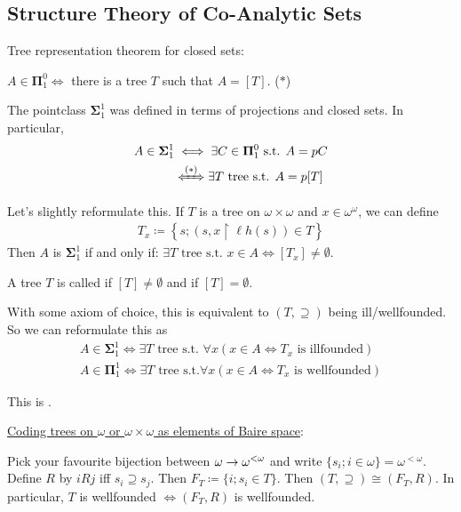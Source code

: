 \documentclass[]{article}
\newcommand{\om}{\omega}
\newcommand{\lom}{{<\omega}}
\newcommand{\lh}{\ell h}
\newcommand{\bosig}{\bm{\Sigma}}
\newcommand{\bopi}{\bm{\Pi}}
\begin{document}
\subsection*{Structure Theory of Co-Analytic Sets}

Tree representation theorem for closed sets:

$ A \in \bopi^0_1 \iff $ there is a tree $T$ such that $A = [T]$. ($\ast$)

The pointclass $\bosig^1_1$ was defined in terms of projections and closed sets. In particular,
\begin{align*}
A \in \bosig^1_1&\iff \exists C\in \bopi^0_1 \textrm{ s.t. } A = pC\\
&\xLeftrightarrow{(\ast)} \exists T\textrm{ tree s.t. }A = p[T]
\end{align*}

Let's slightly reformulate this. If $T$ is a tree on $\om \times \om$ and $x \in \om^\om$, we can define
\begin{align*}
    T_x\coloneqq \left\lbrace s; (s,x\restriction \lh(s))\in T\right\rbrace
\end{align*}
Then $A$ is $\bosig^1_1$ if and only if: $\exists T \textrm{ tree s.t. } x \in A \iff [T_x]\ne \emptyset$.

\begin{defin*}
    A tree $T$ is called  if $[T] \ne \emptyset$ and  if $[T] = \emptyset$.

    With some axiom of choice, this is equivalent to $(T,\supseteq)$ being ill/wellfounded. So we can reformulate this as
    \begin{align*}
        A \in \bosig^1_1 \iff \exists T\textrm{ tree s.t. }\forall x(x\in A \iff T_x\textrm{ is illfounded})\\
        A \in \bopi^1_1 \iff \exists T\textrm{ tree s.t.}\forall x(x\in A \iff T_x\textrm{ is wellfounded})
    \end{align*}

    This is .
\end{defin*}

\underline{Coding trees on $\om$ or $\om\times\om$ as elements of Baire space}:

Pick your favourite bijection between $\om\ra \om^\lom$ and write $\{s_i;i\in \om\} = \om^\lom$. Define $R$ by $iRj$ iff $s_i\supseteq s_j$. Then $F_T\coloneqq \{i;s_i \in T\}$. Then $(T,\supseteq)\cong (F_T,R)$. In particular, $T$ is wellfounded $\iff (F_T,R)$ is wellfounded.
\end{document}
